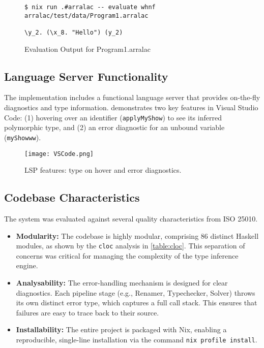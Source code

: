 \begin{figure}
    \centering
    \begin{verbatim}
$ nix run .#arralac -- evaluate whnf arralac/test/data/Program1.arralac

\y_2. (\x_8. "Hello") (y_2)
\end{verbatim}
    \caption{Evaluation Output for Program1.arralac}
\end{figure}

\subsection{Language Server Functionality}
The implementation includes a functional language server that provides on-the-fly diagnostics and type information.  demonstrates two key features in Visual Studio Code: (1) hovering over an identifier (\texttt{applyMyShow}) to see its inferred polymorphic type, and (2) an error diagnostic for an unbound variable (\texttt{myShowww}).

\begin{figure}[h!]
    \centering
    \texttt{[image: VSCode.png]}
    \caption{LSP features: type on hover and error diagnostics.}
    \label{fig:lsp-demo}
\end{figure}

\subsection{Codebase Characteristics}
The system was evaluated against several quality characteristics from ISO 25010.
\begin{itemize}
    \item \textbf{Modularity:} The codebase is highly modular, comprising 86 distinct Haskell modules, as shown by the \texttt{cloc} analysis in \cref{table:cloc}. This separation of concerns was critical for managing the complexity of the type inference engine.
    \item \textbf{Analysability:} The error-handling mechanism is designed for clear diagnostics. Each pipeline stage (e.g., Renamer, Typechecker, Solver) throws its own distinct error type, which captures a full call stack. This ensures that failures are easy to trace back to their source.
    \item \textbf{Installability:} The entire project is packaged with Nix, enabling a reproducible, single-line installation via the command \texttt{nix profile install}.
\end{itemize}

